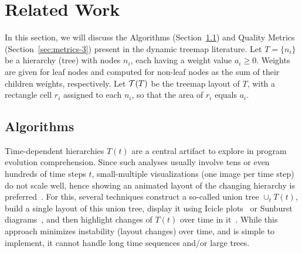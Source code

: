 \section{Related Work}
\label{sec:related_work}

In this section, we will discuss the Algorithms (Section~\ref{sec:algorithms}) and Quality Metrics (Section~\ref{sec:metrics-3}) present in the dynamic treemap literature.
Let $T= \{n_i\}$ be a hierarchy (tree) with nodes $n_i$, each having a weight value $a_i \geq 0$. Weights are given for leaf nodes and computed for non-leaf nodes as the sum of their children weights, respectively. Let ${\cal T}(T)$ be the treemap layout of $T$, with a rectangle cell $r_i$ assigned to each $n_i$, so that the area of $r_i$ equals $a_i$.

\subsection{Algorithms}
\label{sec:algorithms}
%
Time-dependent hierarchies $T(t)$ are a central artifact to explore in program evolution comprehension. Since such analyses usually involve tens or even hundreds of time steps $t$, small-multiple visualizations (one image per time step) do not scale well, hence showing an animated layout of the changing hierarchy is preferred~\citep{diehl08}. For this, several techniques construct a so-called union tree $\cup_tT(t)$, build a single layout of this union tree, display it using Icicle plots~\citep{Kruskal1983} or Sunburst diagrams~\citep{sunburst}, and then highlight changes of $T(t)$ over time in it~\citep{ersoy_sequence}. While this approach minimizes instability (layout changes) over time, and is simple to implement, it cannot handle long time sequences and/or large trees.

